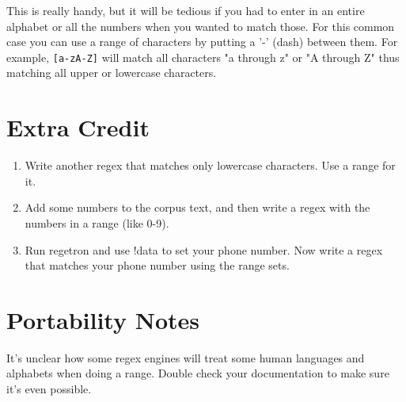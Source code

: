 This is really handy, but it will be tedious if you had to enter in an
entire alphabet or all the numbers when you wanted to match those.  For
this common case you can use a range of characters by putting a 
'-' (dash) between them.  For example, \verb|[a-zA-Z]| will match
all characters "a through z" or "A through Z" thus matching all upper
or lowercase characters.

\section{Extra Credit}

\begin{enumerate}
\item Write another regex that matches only lowercase characters.  Use a range
    for it.
\item Add some numbers to the corpus text, and then write a regex with the
    numbers in a range (like 0-9).
\item Run regetron and use !data to set your phone number.  Now write a regex
    that matches your phone number using the range sets.
\end{enumerate}

\section{Portability Notes}

It's unclear how some regex engines will treat some human languages and alphabets
when doing a range.  Double check your documentation to make sure it's even
possible.


